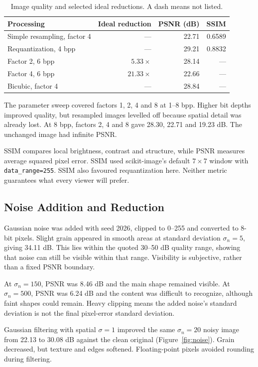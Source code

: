 \documentclass[11pt,a4paper]{article}
\begin{document}
\begin{table}[H]
\centering
\caption{Image quality and selected ideal reductions. A dash means not listed.}
\label{tab:images}
\small
\begin{tabular}{lrrr}
\toprule
Processing & Ideal reduction & PSNR (dB) & SSIM\\
\midrule
Simple resampling, factor 4 & --- & 22.71 & 0.6589\\
Requantization, 4 bpp & --- & 29.21 & 0.8832\\
Factor 2, 6 bpp & \(5.33\times\) & 28.14 & ---\\
Factor 4, 6 bpp & \(21.33\times\) & 22.66 & ---\\
Bicubic, factor 4 & --- & 28.84 & ---\\
\bottomrule
\end{tabular}
\end{table}

The parameter sweep covered factors 1, 2, 4 and 8 at 1--8 bpp. Higher bit depths
improved quality, but resampled images levelled off because spatial detail was
already lost. At 8 bpp, factors 2, 4 and 8 gave 28.30, 22.71 and 19.23 dB.
The unchanged image had infinite PSNR.

SSIM compares local brightness, contrast and structure, while PSNR measures
average squared pixel error. SSIM used scikit-image's default \(7\times7\) window
with \texttt{data\_range=255}. SSIM also favoured requantization here.
Neither metric guarantees what every viewer will prefer.

\subsection{Noise Addition and Reduction}
Gaussian noise was added with seed 2026, clipped to 0--255 and converted to
8-bit pixels. Slight grain appeared in smooth areas at standard deviation
\(\sigma_n=5\), giving 34.11 dB. This lies within the quoted 30--50 dB quality
range, showing that noise can still be visible within that range. Visibility
is subjective, rather than a fixed PSNR boundary.

At \(\sigma_n=150\), PSNR was 8.46 dB and the main shape remained visible.
At \(\sigma_n=500\), PSNR was 6.24 dB and the content was difficult to recognize,
although faint shapes could remain. Heavy clipping means the added noise's
standard deviation is not the final pixel-error standard deviation.

Gaussian filtering with spatial \(\sigma=1\) improved the same
\(\sigma_n=20\) noisy image from 22.13 to 30.08 dB against the clean original
(Figure~\ref{fig:noise}). Grain decreased, but texture and edges softened.
Floating-point pixels avoided rounding during filtering.
\end{document}
